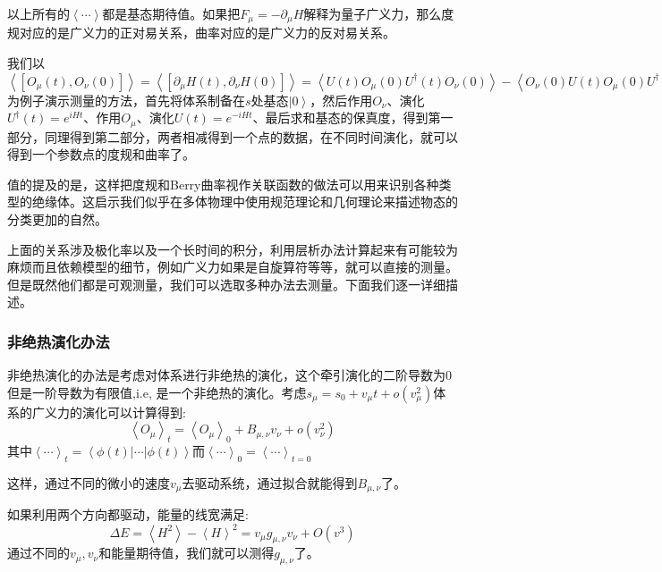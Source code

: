 \documentclass[supercite]{HustGraduPaper}
\newcommand{\bra}[1]{\left\langle #1 \right|}
\newcommand{\ket}[1]{\left| #1 \right\rangle}
\newcommand{\avg}[1]{\left\langle #1 \right\rangle}
\begin{document}
以上所有的$\avg{\cdots} $都是基态期待值。如果把$F_\mu = -\partial_\mu H$解释为量子广义力，那么度规对应的是广义力的正对易关系，曲率对应的是广义力的反对易关系。

我们以$\avg{[O_\mu(t), O_\nu(0)]} = \avg{[\partial_\mu H(t),\partial_\nu H(0)]} = \avg{U(t)O_\mu(0)U^\dagger(t) O_\nu(0)} - \avg{O_\nu(0)U(t)O_\mu(0)U^\dagger(t) O_\nu(0)}$为例子演示测量的方法，首先将体系制备在$s$处基态$\ket{0}$，然后作用$O_\nu$、演化$U^\dagger(t) = e^{iHt}$、作用$O_\mu$、演化$U(t) = e^{-iHt}$、最后求和基态的保真度，得到第一部分，同理得到第二部分，两者相减得到一个点的数据，在不同时间演化，就可以得到一个参数点的度规和曲率了。

值的提及的是，这样把度规和Berry曲率视作关联函数的做法可以用来识别各种类型的绝缘体\cite{kohn1964theory,resta2006kohn,ozawa2019localization,marrazzo2019local}。这启示我们似乎在多体物理中使用规范理论和几何理论来描述物态的分类更加的自然\cite{wen2004quantum}。

上面的关系涉及极化率以及一个长时间的积分，利用层析办法计算起来有可能较为麻烦而且依赖模型的细节，例如广义力如果是自旋算符等等，就可以直接的测量。但是既然他们都是可观测量，我们可以选取多种办法去测量。下面我们逐一详细描述。
    
   \subsubsection{非绝热演化办法}
   非绝热演化的办法是考虑对体系进行非绝热的演化\cite{kolodrubetz2017geometry,gritsev2012dynamical,roushan2014observation}，这个牵引演化的二阶导数为$0$但是一阶导数为有限值,i.e, 是一个非绝热的演化。考虑$s_\mu = s_0 + v_\mu t+ o(v_\mu^2)$体系的广义力的演化可以计算得到:
   \begin{equation}
   \avg{O_\mu}_t = \avg{O_\mu}_0 + B_{\mu,\nu} v_\nu + o(v_\nu^2)
   \end{equation}
   其中$\avg{\cdots}_t = \bra{\phi(t)} \cdots \ket{\phi(t)}$而$\avg{\cdots}_0 = \avg{\cdots}_{t=0}$
   
   这样，通过不同的微小的速度$v_\mu$去驱动系统，通过拟合就能得到$B_{\mu,\nu}$了。
   
   
   如果利用两个方向都驱动，能量的线宽满足:
   \begin{equation}
   \Delta E = \avg{H^2} - \avg{H}^2 = v_\mu g_{\mu,\nu} v_\nu + O(v^3)
   \end{equation}
   通过不同的$v_\mu,v_\nu$和能量期待值，我们就可以测得$g_{\mu,\nu}$了。
\end{document}
